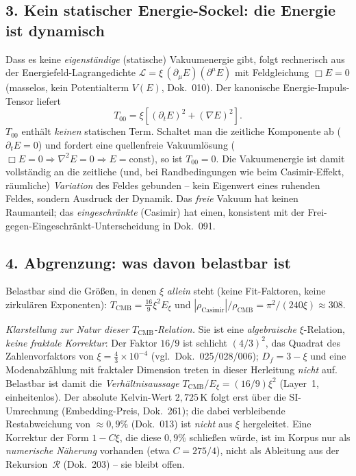\subsection*{3. Kein statischer Energie-Sockel: die Energie ist dynamisch}

Dass es keine \emph{eigenständige} (statische) Vakuumenergie gibt, folgt
rechnerisch aus der Energiefeld-Lagrangedichte $\mathcal{L}=\xi\,(\partial_\mu
E)(\partial^\mu E)$ mit Feldgleichung $\Box E=0$ (masselos, kein Potentialterm
$V(E)$, Dok.~010). Der kanonische Energie-Impuls-Tensor liefert
\[
  T_{00} = \xi\left[(\partial_t E)^2 + (\nabla E)^2\right].
\]
$T_{00}$ enthält \emph{keinen} statischen Term. Schaltet man die zeitliche
Komponente ab ($\partial_t E=0$) und fordert eine quellenfreie Vakuumlösung
($\Box E=0\Rightarrow\nabla^2 E=0\Rightarrow E=\text{const}$), so ist
$T_{00}=0$. Die Vakuumenergie ist damit vollständig an die zeitliche (und,
bei Randbedingungen wie beim Casimir-Effekt, räumliche) \emph{Variation} des
Feldes gebunden -- kein Eigenwert eines ruhenden Feldes, sondern Ausdruck
der Dynamik. Das \emph{freie} Vakuum hat keinen Raumanteil; das
\emph{eingeschränkte} (Casimir) hat einen, konsistent mit der
Frei-gegen-Eingeschränkt-Unterscheidung in Dok.~091.

\subsection*{4. Abgrenzung: was davon belastbar ist}

Belastbar sind die Größen, in denen $\xi$ \emph{allein} steht (keine
Fit-Faktoren, keine zirkulären Exponenten): $T_{\text{CMB}}=\tfrac{16}{9}\xi^2
E_\xi$ und $|\rho_{\text{Casimir}}|/\rho_{\text{CMB}}=\pi^2/(240\xi)\approx308$.

\emph{Klarstellung zur Natur dieser $T_{\text{CMB}}$-Relation.} Sie ist eine
\emph{algebraische} $\xi$-Relation, \emph{keine fraktale Korrektur}: Der Faktor
$16/9$ ist schlicht $(4/3)^2$, das Quadrat des Zahlenvorfaktors von
$\xi = \tfrac{4}{3}\times10^{-4}$ (vgl.\ Dok.~025/028/006); $D_f = 3-\xi$ und
eine Modenabzählung mit fraktaler Dimension treten in dieser Herleitung
\emph{nicht} auf. Belastbar ist damit die \emph{Verhältnisaussage}
$T_{\text{CMB}}/E_\xi = (16/9)\xi^2$ (Layer~1, einheitenlos). Der absolute
Kelvin-Wert $2{,}725$\,K folgt erst über die SI-Umrechnung (Embedding-Preis,
Dok.~261); die dabei verbleibende Restabweichung von $\approx 0{,}9\%$
(Dok.~013) ist \emph{nicht} aus $\xi$ hergeleitet. Eine Korrektur der Form
$1-C\xi$, die diese $0{,}9\%$ schließen würde, ist im Korpus nur als
\emph{numerische Näherung} vorhanden (etwa $C=275/4$), nicht als Ableitung aus
der Rekursion~$\mathcal{R}$ (Dok.~203) -- sie bleibt offen.

